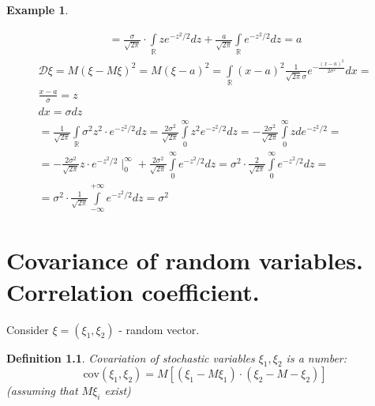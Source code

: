 \documentclass[12pt,letterpaper]{report}
\newtheorem*{example}{Example}
\newtheorem{definition}{Definition}
\begin{document}
\begin{example}
\begin{itemize}
\begin{gather*}
            = \frac{\sigma}{\sqrt{2\pi}} \cdot \int\limits_{\mathbb{R}}^{} z e^{-z^2/2} dz + 
                \frac{a}{\sqrt{2\pi}} \int\limits_{\mathbb{R}}^{} e^{-z^2/2} dz = a
            \end{gather*}
            \begin{gather*}
                \mathcal{D}\xi = M(\xi -M\xi)^2 = M(\xi -a)^2 =
                \int\limits_{\mathbb{R}}^{} (x-a)^2 \frac{1}{\sqrt{2\pi}\sigma} e^{-\frac{(x-a)^2}{2\sigma^2}}dx = \\
                \frac{x-a}{\sigma} = z \\
                dx = \sigma dz \\
                = \frac{1}{\sqrt{2\pi}} \int\limits_{\mathbb{R}}^{} \sigma^2 z^2 \cdot e^{-z^2/2} dz =
                \frac{2\sigma^2}{\sqrt{2\pi}} \int\limits_{0}^{\infty} z^2 e^{-z^2/2} dz =
                - \frac{2\sigma^2}{\sqrt{2\pi}} \int\limits_{0}^{\infty} z de^{-z^2/2} = \\
                = -\frac{2\sigma^2}{\sqrt{2\pi}} z \cdot e^{-z^2/2} \mid_0^{\infty} +
                    \frac{2\sigma^2}{\sqrt{2\pi}} \int\limits_{0}^{\infty} e^{-z^2/2} dz =
                \sigma^2\cdot \frac{2}{\sqrt{2\pi}} \int\limits_{0}^{\infty} e^{-z^2/2}dz = \\
                = \sigma^2 \cdot \frac{1}{\sqrt{2\pi}} \int\limits_{-\infty}^{+\infty} e^{-z^2/2}dz = \sigma^2
            \end{gather*}
        \end{itemize}
\end{example}




\chapter{Covariance of random variables. Correlation coefficient.}

Consider $\xi = (\xi_1, \xi_2)$ - random vector.

\begin{definition}
    Covariation of stochastic variables $\xi_1, \xi_2$ is a number:
    \begin{equation}
        \text{cov}(\xi_1, \xi_2) = M[(\xi_1 -M\xi_1) \cdot(\xi_2 - M-\xi_2)]
    \end{equation}
    (assuming that $M\xi_i$ exist)

\end{definition}
\end{document}
